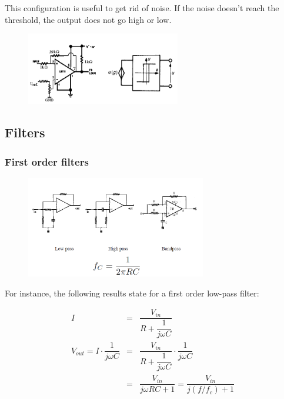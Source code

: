This configuration is useful to get rid of noise. If the noise doesn't reach the threshold, the output does not go high or low.

\begin{figure}[H]
    \centering
    \includegraphics[width = 0.6\textwidth]{L4/img/schmitt.PNG}
\end{figure}

\subsection{Filters}

\subsubsection{First order filters}

\begin{figure}[H]
    \centering
    \includegraphics[width = 0.7\textwidth]{L4/img/first-order-filters.PNG}
\end{figure}

For instance, the following results state for a first order low-pass filter:

\begin{eqnarray}
I &=& \dfrac{V_{in}}{R + \dfrac{1}{j\omega C}} \\
V_{out} = I\cdot \dfrac{1}{j\omega C} &=& \dfrac{V_{in}}{R + \dfrac{1}{j\omega C}} \cdot \dfrac{1}{j\omega C} \\
 &=& \dfrac{V_{in}}{j\omega RC + 1} = \dfrac{V_{in}}{j(f/f_c) + 1}
\end{eqnarray}

